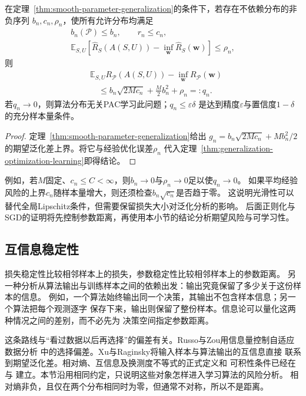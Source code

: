 \begin{theorem}[光滑损失下参数稳定性与可学习性]
\label{thm:smooth-parameter-learning}
在定理~\ref{thm:smooth-parameter-generalization}的条件下，若存在不依赖分布的非负序列
$b_n,c_n,\rho_n$，使所有允许分布均满足
\begin{gather*}
 b_n(\mathcal P)\leq b_n,\qquad r_n\leq c_n,\\
 \mathbb E_{S,U}[\hat R_S(A(S,U))-\inf_{\bm w}\hat R_S(\bm w)]\leq\rho_n,
\end{gather*}
则
\begin{align*}
 &\mathbb E_{S,U}R_{\mathcal P}(A(S,U))-\inf_{\bm w}R_{\mathcal P}(\bm w)\\
 &\quad\leq b_n\sqrt{2Mc_n}+\frac M2b_n^2+\rho_n=:q_n.
\end{align*}
若$q_n\to0$，则算法分布无关PAC学习此问题；$q_n\leq\varepsilon\delta$
是达到精度$\varepsilon$与置信度$1-\delta$的充分样本量条件。
\end{theorem}
\begin{proof}
定理~\ref{thm:smooth-parameter-generalization}给出
$g_n=b_n\sqrt{2Mc_n}+Mb_n^2/2$的期望泛化差上界。将它与经验优化误差$\rho_n$
代入定理~\ref{thm:generalization-optimization-learning}即得结论。
\end{proof}

例如，若$M$固定、$c_n\leq C<\infty$，则$b_n\to0$与$\rho_n\to0$足以使$q_n\to0$。
如果平均经验风险的上界$c_n$随样本量增大，则还须检查$b_n\sqrt{c_n}$是否趋于零。
这说明光滑性可以替代全局Lipschitz条件，但需要保留损失大小对泛化分析的影响。
后面正则化与SGD的证明将先控制参数距离，再使用本小节的结论分析期望风险与可学习性。

\subsection{互信息稳定性}
\label{sec:information-stability}

损失稳定性比较相邻样本上的损失，参数稳定性比较相邻样本上的参数距离。
另一种分析从算法输出与训练样本之间的依赖出发：输出究竟保留了多少关于这份样本的信息。
例如，一个算法始终输出同一个决策，其输出不包含样本信息；另一个算法把每个观测逐字
保存下来，输出则保留了整份样本。信息论可以量化这两种情况之间的差别，而不必先为
决策空间指定参数距离。

这条路线与“看过数据以后再选择”的偏差有关。Russo与Zou用信息量控制自适应数据分析
中的选择偏差。Xu与Raginsky将输入样本与算法输出的互信息直接
联系到期望泛化差。相对熵、互信息及换测度不等式的正式定义和
可积性条件已经在
与
建立。本节沿用相同约定，只说明这些对象怎样进入学习算法的风险分析。
相对熵非负，且仅在两个分布相同时为零，但通常不对称，所以不是距离。

